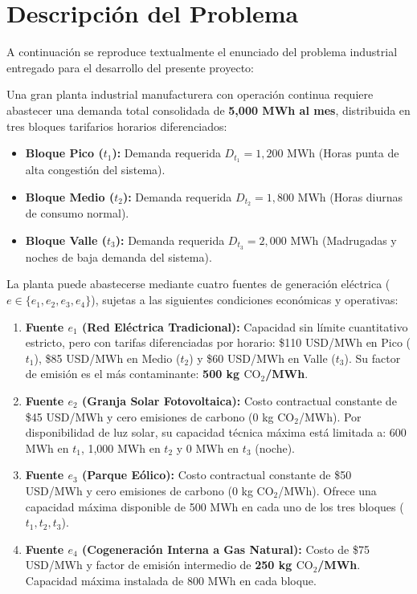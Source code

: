 \documentclass[11pt,a4paper]{article}
\begin{document}
\section{Descripción del Problema}
A continuación se reproduce textualmente el enunciado del problema industrial entregado para el desarrollo del presente proyecto:

\begin{tcolorbox}[colback=white, colframe=primary, arc=2mm, title=\textbf{Enunciado Oficial del Ejercicio de Optimización Energética}]
Una gran planta industrial manufacturera con operación continua requiere abastecer una demanda total consolidada de \textbf{5,000 MWh al mes}, distribuida en tres bloques tarifarios horarios diferenciados:
\begin{itemize}
    \item \textbf{Bloque Pico ($t_1$):} Demanda requerida $D_{t_1} = 1,200\text{ MWh}$ (Horas punta de alta congestión del sistema).
    \item \textbf{Bloque Medio ($t_2$):} Demanda requerida $D_{t_2} = 1,800\text{ MWh}$ (Horas diurnas de consumo normal).
    \item \textbf{Bloque Valle ($t_3$):} Demanda requerida $D_{t_3} = 2,000\text{ MWh}$ (Madrugadas y noches de baja demanda del sistema).
\end{itemize}

La planta puede abastecerse mediante cuatro fuentes de generación eléctrica ($e \in \{e_1, e_2, e_3, e_4\}$), sujetas a las siguientes condiciones económicas y operativas:
\begin{enumerate}
    \item \textbf{Fuente $e_1$ (Red Eléctrica Tradicional):} Capacidad sin límite cuantitativo estricto, pero con tarifas diferenciadas por horario: \$110 USD/MWh en Pico ($t_1$), \$85 USD/MWh en Medio ($t_2$) y \$60 USD/MWh en Valle ($t_3$). Su factor de emisión es el más contaminante: \textbf{500 kg $\text{CO}_2$/MWh}.
    \item \textbf{Fuente $e_2$ (Granja Solar Fotovoltaica):} Costo contractual constante de \$45 USD/MWh y cero emisiones de carbono (0 kg $\text{CO}_2$/MWh). Por disponibilidad de luz solar, su capacidad técnica máxima está limitada a: 600 MWh en $t_1$, 1,000 MWh en $t_2$ y 0 MWh en $t_3$ (noche).
    \item \textbf{Fuente $e_3$ (Parque Eólico):} Costo contractual constante de \$50 USD/MWh y cero emisiones de carbono (0 kg $\text{CO}_2$/MWh). Ofrece una capacidad máxima disponible de 500 MWh en cada uno de los tres bloques ($t_1, t_2, t_3$).
    \item \textbf{Fuente $e_4$ (Cogeneración Interna a Gas Natural):} Costo de \$75 USD/MWh y factor de emisión intermedio de \textbf{250 kg $\text{CO}_2$/MWh}. Capacidad máxima instalada de 800 MWh en cada bloque.
\end{enumerate}


\end{tcolorbox}
\end{document}
